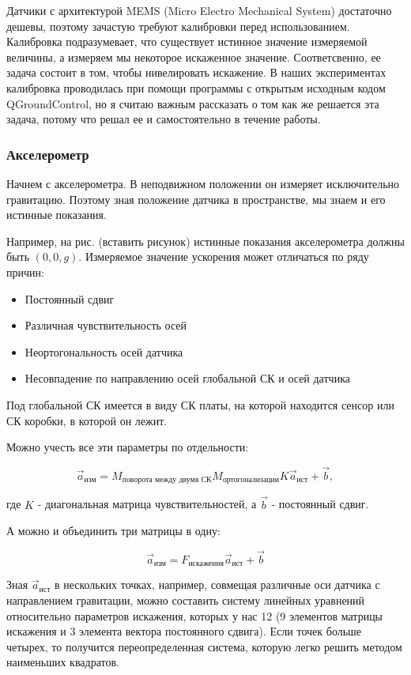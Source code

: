 \documentclass[a4paper]{article}
\begin{document}
Датчики с архитектурой MEMS (Micro Electro Mechanical System) достаточно дешевы, поэтому зачастую требуют калибровки перед использованием. Калибровка подразумевает, что существует истинное значение измеряемой величины, а измеряем мы некоторое искаженное значение. Соответсвенно, ее задача состоит в том, чтобы нивелировать искажение. В наших экспериментах калибровка проводилась при помощи программы с открытым исходным кодом QGroundControl, но я считаю важным рассказать о том как же решается эта задача, потому что решал ее и самостоятельно в течение работы.

\subsubsection{Акселерометр}

Начнем с акселерометра. В неподвижном положении он измеряет исключительно гравитацию. Поэтому зная положение датчика в пространстве, мы знаем и его истинные показания.

Например, на рис. (вставить рисунок) истинные показания акселерометра должны быть $(0, 0, g)$. Измеряемое значение ускорения может отличаться по ряду причин:

\begin{itemize}
	\item Постоянный сдвиг
	\item Различная чувствительность осей
	\item Неортогональность осей датчика
	\item Несовпадение по направлению осей глобальной СК и осей датчика
\end{itemize}

Под глобальной СК имеется в виду СК платы, на которой находится сенсор или СК коробки, в которой он лежит.

Можно учесть все эти параметры по отдельности:

$$ \vec{a}_{\text{изм}} = M_{\text{поворота между двумя СК}} M_{\text{ортогонализации}} K \vec{a}_{\text{ист}} + \vec{b},$$

где $K$ - диагональная матрица чувствительностей, а $\vec{b}$ - постоянный сдвиг.

А можно и объединить три матрицы в одну:

$$ \vec{a}_{\text{изм}} = F_{\text{искажения}}\vec{a}_{\text{ист}} + \vec{b} $$

Зная $\vec{a}_{\text{ист}}$ в нескольких точках, например, совмещая различные оси датчика с направлением гравитации, можно составить систему линейных уравнений относительно параметров искажения, которых у нас 12 (9 элементов матрицы искажения и 3 элемента вектора постоянного сдвига). Если точек больше четырех, то получится переопределенная система, которую легко решить методом наименьших квадратов.
\end{document}
